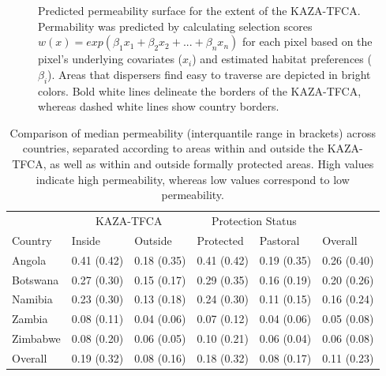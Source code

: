 \documentclass[abstract=on,10pt,a4paper,bibliography=totocnumbered]{article}
\begin{document}
\begin{figure}[hbtp]
  \begin{center}
    \caption{Predicted permeability surface for the extent of the KAZA-TFCA.
    Permability was predicted by calculating selection scores \(w(x) =
    exp(\beta_1 x_1 + \beta_2 x_2 + ... + \beta_n x_n)\) for each pixel based on
    the pixel's underlying covariates (\(x_i\)) and estimated habitat
    preferences (\(\beta_i\)). Areas that dispersers find easy to traverse are
    depicted in bright colors. Bold white lines delineate the borders of the
    KAZA-TFCA, whereas dashed white lines show country borders.}
    \label{PermeabilityMap}
  \end{center}
\end{figure}

\begin{table}[h]
  \begin{center}
  \caption{Comparison of median permeability (interquantile range in brackets)
  across countries, separated according to areas within and outside the
  KAZA-TFCA, as well as within and outside formally protected areas. High values
  indicate high permeability, whereas low values correspond to low
  permeability.}
  \label{PermeabilityComp}
  \begin{tabular}{llllll}
    \toprule
    \multicolumn{1}{c}{ } & \multicolumn{2}{c}{KAZA-TFCA} & \multicolumn{2}{c}{Protection Status} & \multicolumn{1}{c}{ } \\
    \cmidrule(l{3pt}r{3pt}){2-3} \cmidrule(l{3pt}r{3pt}){4-5}
    Country & Inside & Outside & Protected & Pastoral & Overall\\
    \midrule
    Angola & 0.41 (0.42) & 0.18 (0.35) & 0.41 (0.42) & 0.19 (0.35) & 0.26 (0.40) \\
    Botswana & 0.27 (0.30) & 0.15 (0.17) & 0.29 (0.35) & 0.16 (0.19) & 0.20 (0.26) \\
    Namibia & 0.23 (0.30) & 0.13 (0.18) & 0.24 (0.30) & 0.11 (0.15) & 0.16 (0.24) \\
    Zambia & 0.08 (0.11) & 0.04 (0.06) & 0.07 (0.12) & 0.04 (0.06) & 0.05 (0.08) \\
    Zimbabwe & 0.08 (0.20) & 0.06 (0.05) & 0.10 (0.21) & 0.06 (0.04) & 0.06 (0.08) \\
    \hline
    Overall & 0.19 (0.32) & 0.08 (0.16) & 0.18 (0.32) & 0.08 (0.17) & 0.11 (0.23)\\
    \bottomrule
  \end{tabular}
  \end{center}
\end{table}
\end{document}
